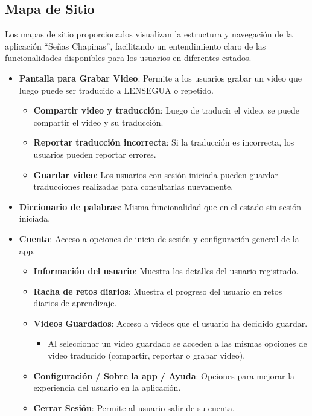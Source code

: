 
\subsection{Mapa de Sitio}

Los mapas de sitio proporcionados visualizan la estructura y navegación de la aplicación ``Señas Chapinas'', facilitando un entendimiento claro de las funcionalidades disponibles para los usuarios en diferentes estados.

\begin{itemize}
    \item \textbf{Pantalla para Grabar Video}: Permite a los usuarios grabar un video que luego puede ser traducido a LENSEGUA o repetido. 
    \begin{itemize}
        \item \textbf{Compartir video y traducción}: Luego de traducir el video, se puede compartir el video y su traducción.
        \item \textbf{Reportar traducción incorrecta}: Si la traducción es incorrecta, los usuarios pueden reportar errores.
        \item \textbf{Guardar video}: Los usuarios con sesión iniciada pueden guardar traducciones realizadas para consultarlas nuevamente.
    \end{itemize}
    \item \textbf{Diccionario de palabras}: Misma funcionalidad que en el estado sin sesión iniciada.
    \item \textbf{Cuenta}: Acceso a opciones de inicio de sesión y configuración general de la app.
    \begin{itemize}
        \item \textbf{Información del usuario}: Muestra los detalles del usuario registrado.
        \item \textbf{Racha de retos diarios}: Muestra el progreso del usuario en retos diarios de aprendizaje.
        \item \textbf{Videos Guardados}: Acceso a videos que el usuario ha decidido guardar.
        \begin{itemize}
            \item Al seleccionar un video guardado se acceden a las mismas opciones de video traducido (compartir, reportar o grabar video).
        \end{itemize}
        \item \textbf{Configuración / Sobre la app / Ayuda}: Opciones para mejorar la experiencia del usuario en la aplicación.
        \item \textbf{Cerrar Sesión}: Permite al usuario salir de su cuenta.
    \end{itemize}
\end{itemize}


